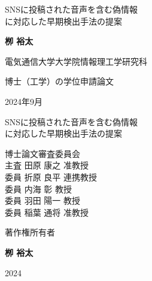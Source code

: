 \documentclass[a4paper,twoside,12pt,uplatex]{jsreport}    %
\theoremstyle{definition}%
\begin{document}
\baselineskip 22pt

\begin{titlepage}
  \Large
  \begin{center}
   {\LARGE     %
      SNSに投稿された音声を含む偽情報\\に対応した早期検出手法の提案
    }
  \end{center}
  \vspace{60mm}
  \centerline{\bf 栁 裕太}
  \vspace{20mm}
  \centerline{電気通信大学大学院情報理工学研究科}
  \centerline{博士（工学）の学位申請論文}
  \vspace{25mm}
  \centerline{\large 2024年9月}


  \cleardoublepage
  \begin{center}
   {\LARGE     %
      SNSに投稿された音声を含む偽情報\\に対応した早期検出手法の提案
    }
  \end{center}
  \vspace{60mm}
  \hspace{50mm}博士論文審査委員会\\
  \hspace{60mm}主査 \hspace{6mm} 田原 康之\hspace{3mm} 准教授\\
  \hspace{60mm}委員 \hspace{6mm} 折原 良平\hspace{3mm} 連携教授\\
  \hspace{60mm}委員 \hspace{6mm} 内海 彰 \hspace{6mm} 教授\\
  \hspace{60mm}委員 \hspace{6mm} 羽田 陽一\hspace{3mm} 教授\\
  \hspace{60mm}委員 \hspace{6mm} 稲葉 通将\hspace{3mm} 准教授\\
  \thispagestyle{empty}
  \cleardoublepage
  \vspace*{70mm}
  \centerline{\LARGE 著作権所有者}
  \vspace{20mm}
  \centerline{\bf 栁 裕太}
  \vspace{10mm}
  \centerline{\large 2024}
  \thispagestyle{empty}
\end{titlepage}
\thispagestyle{empty}

\end{document}

